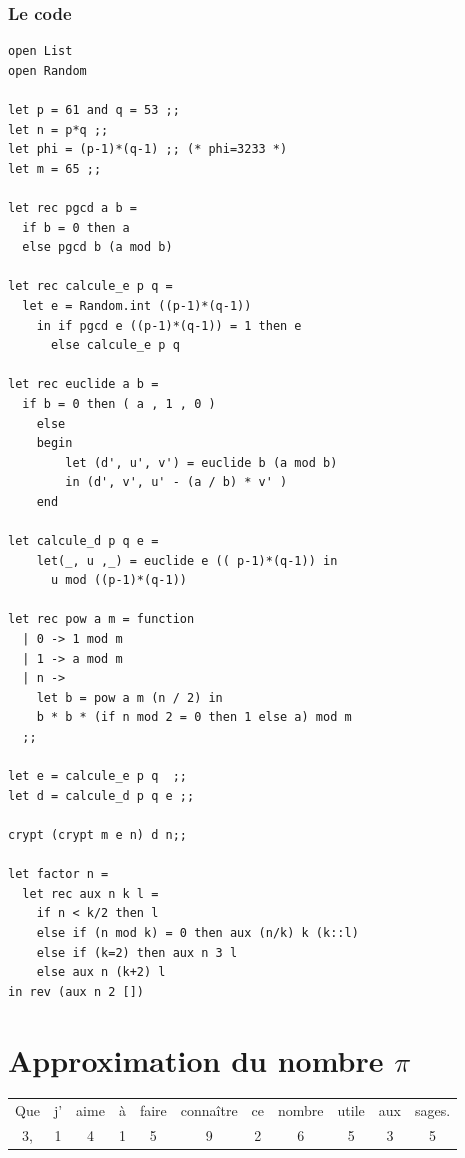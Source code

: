  \subsubsection{Le code}
 \begin{Verbatim}
open List
open Random 

let p = 61 and q = 53 ;;
let n = p*q ;;
let phi = (p-1)*(q-1) ;; (* phi=3233 *)
let m = 65 ;;

let rec pgcd a b =
  if b = 0 then a 
  else pgcd b (a mod b)

let rec calcule_e p q =
  let e = Random.int ((p-1)*(q-1))
    in if pgcd e ((p-1)*(q-1)) = 1 then e
      else calcule_e p q  

let rec euclide a b = 
  if b = 0 then ( a , 1 , 0 ) 
    else 
    begin
        let (d', u', v') = euclide b (a mod b)
        in (d', v', u' - (a / b) * v' )
    end

let calcule_d p q e =
    let(_, u ,_) = euclide e (( p-1)*(q-1)) in
      u mod ((p-1)*(q-1))

let rec pow a m = function
  | 0 -> 1 mod m
  | 1 -> a mod m
  | n -> 
    let b = pow a m (n / 2) in
    b * b * (if n mod 2 = 0 then 1 else a) mod m
  ;;    

let e = calcule_e p q  ;;
let d = calcule_d p q e ;;

crypt (crypt m e n) d n;;

let factor n =
  let rec aux n k l =
    if n < k/2 then l
    else if (n mod k) = 0 then aux (n/k) k (k::l)
    else if (k=2) then aux n 3 l 
    else aux n (k+2) l
in rev (aux n 2 [])
\end{Verbatim}

 \section{Approximation du nombre $\pi$ }

\begin{center}
	\begin{tabular}{ccccccccccc}
		Que & j'& aime & à & faire & connaître & ce & nombre & utile & aux & sages. \\
		3,   & 1 &  4   & 1 &  5    &  9        & 2  &  6     &  5    & 3   & 5 \\ 
	\end{tabular}	
\end{center}



